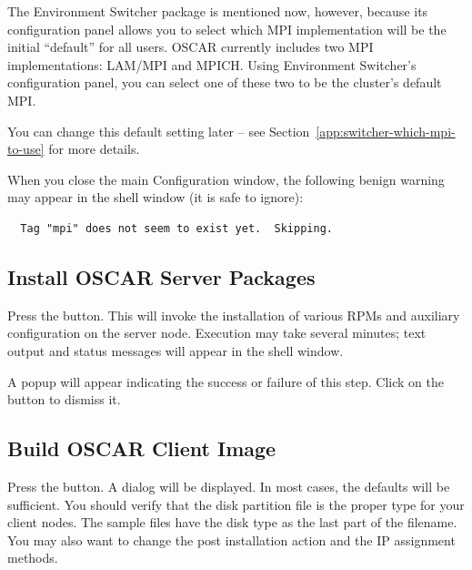 The Environment Switcher package is mentioned now, however, because
its configuration panel allows you to select which MPI implementation
will be the initial ``default'' for all users.  OSCAR currently
includes two MPI implementations: LAM/MPI and MPICH.  Using
Environment Switcher's configuration panel, you can select one of
these two to be the cluster's default MPI.  

You can change this default setting later -- see
Section~\ref{app:switcher-which-mpi-to-use} for more details.

When you close the main Configuration window, the following benign
warning may appear in the shell window (it is safe to ignore):

\begin{verbatim}
  Tag "mpi" does not seem to exist yet.  Skipping.
\end{verbatim}


\subsection{Install OSCAR Server Packages}
\label{det:install-server-packages}

Press the  button.  This will
invoke the installation of various RPMs and auxiliary configuration on
the server node.  Execution may take several minutes; text output
and status messages will appear in the shell window.

A popup will appear indicating the success or failure of this step.
Click on the  button to dismiss it.


\subsection{Build OSCAR Client Image}
\label{det:build-client-image}

Press the  button. A dialog will be
displayed. In most cases, the defaults will be sufficient. You should
verify that the disk partition file is the proper type for your client
nodes. The sample files have the disk type as the last part of the
filename. You may also want to change the post installation action and
the IP assignment methods.  


